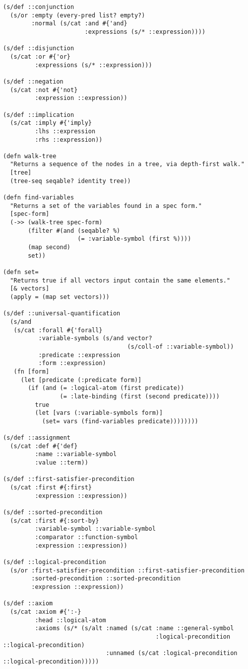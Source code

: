 \begin{lstlisting}
(s/def ::conjunction
  (s/or :empty (every-pred list? empty?)
        :normal (s/cat :and #{'and}
                       :expressions (s/* ::expression))))

(s/def ::disjunction
  (s/cat :or #{'or}
         :expressions (s/* ::expression)))

(s/def ::negation
  (s/cat :not #{'not}
         :expression ::expression))

(s/def ::implication
  (s/cat :imply #{'imply}
         :lhs ::expression
         :rhs ::expression))

(defn walk-tree
  "Returns a sequence of the nodes in a tree, via depth-first walk."
  [tree]
  (tree-seq seqable? identity tree))

(defn find-variables
  "Returns a set of the variables found in a spec form."
  [spec-form]
  (->> (walk-tree spec-form)
       (filter #(and (seqable? %)
                     (= :variable-symbol (first %))))
       (map second)
       set))

(defn set=
  "Returns true if all vectors input contain the same elements."
  [& vectors]
  (apply = (map set vectors)))

(s/def ::universal-quantification
  (s/and
   (s/cat :forall #{'forall}
          :variable-symbols (s/and vector?
                                   (s/coll-of ::variable-symbol))
          :predicate ::expression
          :form ::expression)
   (fn [form]
     (let [predicate (:predicate form)]
       (if (and (= :logical-atom (first predicate))
                (= :late-binding (first (second predicate))))
         true
         (let [vars (:variable-symbols form)]
           (set= vars (find-variables predicate))))))))

(s/def ::assignment
  (s/cat :def #{'def}
         :name ::variable-symbol
         :value ::term))

(s/def ::first-satisfier-precondition
  (s/cat :first #{:first}
         :expression ::expression))

(s/def ::sorted-precondition
  (s/cat :first #{:sort-by}
         :variable-symbol ::variable-symbol
         :comparator ::function-symbol
         :expression ::expression))

(s/def ::logical-precondition
  (s/or :first-satisfier-precondition ::first-satisfier-precondition
        :sorted-precondition ::sorted-precondition
        :expression ::expression))

(s/def ::axiom
  (s/cat :axiom #{':-}
         :head ::logical-atom
         :axioms (s/* (s/alt :named (s/cat :name ::general-symbol
                                           :logical-precondition ::logical-precondition)
                             :unnamed (s/cat :logical-precondition ::logical-precondition)))))


\end{lstlisting}
